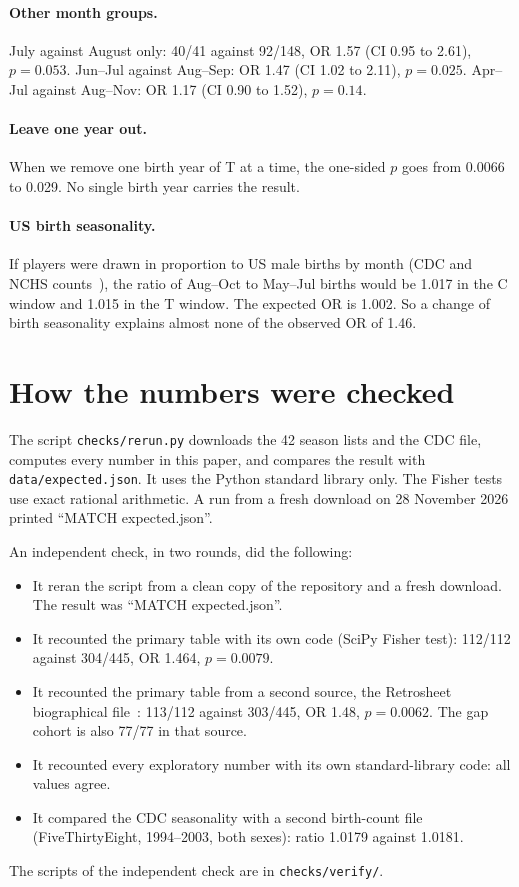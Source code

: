 \documentclass[11pt]{article}
\begin{document}
\paragraph{Other month groups.} July against August only: 40/41 against 92/148, OR 1.57 (CI 0.95 to 2.61), $p = 0.053$. Jun--Jul against Aug--Sep: OR 1.47 (CI 1.02 to 2.11), $p = 0.025$. Apr--Jul against Aug--Nov: OR 1.17 (CI 0.90 to 1.52), $p = 0.14$.

\paragraph{Leave one year out.} When we remove one birth year of T at a time, the one-sided $p$ goes from 0.0066 to 0.029. No single birth year carries the result.

\paragraph{US birth seasonality.} If players were drawn in proportion to US male births by month (CDC and NCHS counts~\cite{cdcbirths}), the ratio of Aug--Oct to May--Jul births would be 1.017 in the C window and 1.015 in the T window. The expected OR is 1.002. So a change of birth seasonality explains almost none of the observed OR of 1.46.

\section{How the numbers were checked}

The script \texttt{checks/rerun.py} downloads the 42 season lists and the CDC file, computes every number in this paper, and compares the result with \texttt{data/expected.json}. It uses the Python standard library only. The Fisher tests use exact rational arithmetic. A run from a fresh download on 28 November 2026 printed ``MATCH expected.json''.

An independent check, in two rounds, did the following:
\begin{itemize}
\item It reran the script from a clean copy of the repository and a fresh download. The result was ``MATCH expected.json''.
\item It recounted the primary table with its own code (SciPy Fisher test): 112/112 against 304/445, OR 1.464, $p = 0.0079$.
\item It recounted the primary table from a second source, the Retrosheet biographical file~\cite{retrosheet}: 113/112 against 303/445, OR 1.48, $p = 0.0062$. The gap cohort is also 77/77 in that source.
\item It recounted every exploratory number with its own standard-library code: all values agree.
\item It compared the CDC seasonality with a second birth-count file (FiveThirtyEight, 1994--2003, both sexes): ratio 1.0179 against 1.0181.
\end{itemize}
The scripts of the independent check are in \texttt{checks/verify/}.
\end{document}
